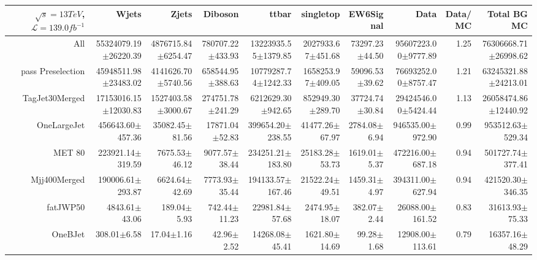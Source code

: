  \begin{tabular}{ r ||  r  r  r  r  r  r || r r r |} 
 \ensuremath{\sqrt{s}=13 TeV}, \ensuremath{\mathcal{L}=139.0 fb^{-1}}  & Wjets & Zjets & Diboson & ttbar & singletop & EW6Signal& Data & Data/MC & Total BG MC \tabularnewline 
 \hline 
All & 55324079.19$\pm$26220.39 & 4876715.84$\pm$6254.47 & 780707.22$\pm$433.93 & 13223935.55$\pm$1379.85 & 2027933.67$\pm$451.68 & 73297.23$\pm$44.50 & 95607223.00$\pm$9777.89 & 1.25 & 76306668.71$\pm$26998.62\tabularnewline \hline 
pass Preselection & 45948511.98$\pm$23483.02 & 4141626.70$\pm$5740.56 & 658544.95$\pm$388.63 & 10779287.74$\pm$1242.33 & 1658253.97$\pm$409.05 & 59096.53$\pm$39.62 & 76693252.00$\pm$8757.47 & 1.21 & 63245321.88$\pm$24213.01\tabularnewline \hline 
TagJet30Merged & 17153016.15$\pm$12030.83 & 1527403.58$\pm$3000.67 & 274751.78$\pm$241.29 & 6212629.30$\pm$942.65 & 852949.30$\pm$289.70 & 37724.74$\pm$30.84 & 29424546.00$\pm$5424.44 & 1.13 & 26058474.86$\pm$12440.92\tabularnewline \hline 
OneLargeJet & 456643.60$\pm$457.36 & 35082.45$\pm$81.56 & 17871.04$\pm$52.83 & 399654.20$\pm$238.55 & 41477.26$\pm$67.97 & 2784.08$\pm$6.94 & 946535.00$\pm$972.90 & 0.99 & 953512.63$\pm$529.34\tabularnewline \hline 
MET 80 & 223921.14$\pm$319.59 & 7675.53$\pm$46.12 & 9077.57$\pm$38.44 & 234251.21$\pm$183.80 & 25183.28$\pm$53.73 & 1619.01$\pm$5.37 & 472216.00$\pm$687.18 & 0.94 & 501727.74$\pm$377.41\tabularnewline \hline 
Mjj400Merged & 190006.61$\pm$293.87 & 6624.64$\pm$42.69 & 7773.93$\pm$35.44 & 194133.57$\pm$167.46 & 21522.24$\pm$49.51 & 1459.31$\pm$4.97 & 394311.00$\pm$627.94 & 0.94 & 421520.30$\pm$346.35\tabularnewline \hline 
fatJWP50 & 4843.61$\pm$43.06 & 189.04$\pm$5.93 & 742.44$\pm$11.23 & 22981.84$\pm$57.68 & 2474.95$\pm$18.07 & 382.07$\pm$2.44 & 26088.00$\pm$161.52 & 0.83 & 31613.93$\pm$75.33\tabularnewline \hline 
OneBJet & 308.01$\pm$6.58 & 17.04$\pm$1.16 & 42.96$\pm$2.52 & 14268.08$\pm$45.41 & 1621.80$\pm$14.69 & 99.28$\pm$1.68 & 12908.00$\pm$113.61 & 0.79 & 16357.16$\pm$48.29\tabularnewline \hline 
\end{tabular}
